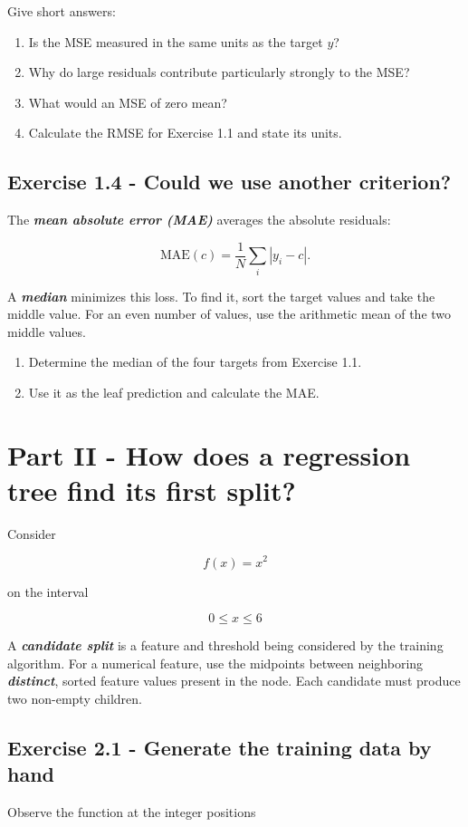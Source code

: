 \documentclass{course_sheet}
\begin{document}
Give short answers:

\begin{enumerate}
\item
Is the MSE measured in the same units as the target $y$?

\item
Why do large residuals contribute particularly strongly to the MSE?

\item
What would an MSE of zero mean?

\item
Calculate the RMSE for Exercise 1.1 and state its units.

\end{enumerate}
\subsection*{Exercise 1.4 - Could we use another criterion?}
The \textbf{\textit{mean absolute error (MAE)}} averages the absolute residuals:

\[
\mathrm{MAE}(c)=\frac1N\sum_i |y_i-c|.
\]

A \textbf{\textit{median}} minimizes this loss. To find it, sort the target values and take the middle value. For an even number of values, use the arithmetic mean of the two middle values.

\begin{enumerate}
\item
Determine the median of the four targets from Exercise 1.1.

\item
Use it as the leaf prediction and calculate the MAE.

\end{enumerate}
\clearpage
\section*{Part II - How does a regression tree find its first split?}
Consider

\[
f(x)=x^2
\]

on the interval

\[
0\leq x\leq 6
\]

A \textbf{\textit{candidate split}} is a feature and threshold being considered by the training algorithm. For a numerical feature, use the midpoints between neighboring \textbf{\textit{distinct}}, sorted feature values present in the node. Each candidate must produce two non-empty children.

\subsection*{Exercise 2.1 - Generate the training data by hand}
Observe the function at the integer positions
\end{document}
